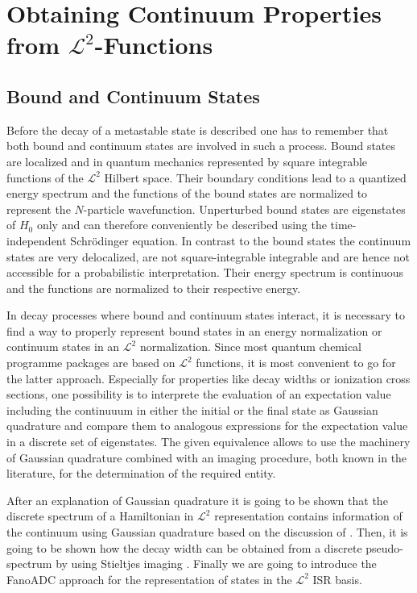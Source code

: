 \chapter[Continuum Properties from $\mathcal{L}^2$ Functions]{Obtaining Continuum Properties from $\mathcal{L}^2$-Functions}


\section{Bound and Continuum States}
Before the decay of a metastable state is described one has to remember
that both bound and continuum states are involved in such a process.
Bound states are localized and in quantum mechanics
represented by square integrable
functions of the $\mathcal{L}^2$ Hilbert space. Their boundary conditions
lead to a quantized energy spectrum and the functions of the bound states
are normalized
to represent the $N$-particle wavefunction.
Unperturbed bound states are eigenstates of $H_0$ only
and can therefore conveniently be described using the time-independent
Schrödinger equation.
In contrast to the bound states the
continuum states are very delocalized, are not square-integrable
integrable and are hence not accessible for a probabilistic interpretation.
Their energy spectrum is continuous and the functions are normalized to
their respective energy.

In decay processes
where bound and continuum states interact, it is necessary to find a way to
properly represent bound states in an energy normalization or continuum states
in an $\mathcal{L}^2$ normalization.
Since most quantum chemical programme packages are based
on $\mathcal{L}^2$ functions,
it is most convenient to go for the latter approach.
Especially for properties like decay widths or ionization cross sections, one
possibility is to interprete the evaluation of an expectation value
including the continuuum in either the initial or the final state as
Gaussian quadrature and compare them to analogous expressions for the
expectation value in a discrete set of eigenstates. The given equivalence
allows to use the machinery of Gaussian quadrature combined with an imaging
procedure, both known in the literature,
for the determination of the required entity. \cite{Reinhardt79}

After an explanation of Gaussian quadrature it is going to be shown that
the discrete spectrum of a Hamiltonian in $\mathcal{L}^2$ representation
contains information of the continuum using Gaussian quadrature
based on the discussion of \cite{Reinhardt79}.
Then, it is going to be shown how the decay width can be obtained from a
discrete pseudo-spectrum by using Stieltjes imaging \cite{Langhoff76,Corcoran77}.
Finally we are going to introduce the FanoADC approach for the representation of
states in the $\mathcal{L}^2$ \ac{ISR} basis.



